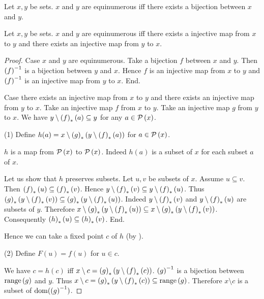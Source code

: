 \documentclass{article}
\begin{document}
  \begin{forthel}
    \begin{definition*}
      Let $x, y$ be sets.
      $x$ and $y$ are equinumerous iff there exists a bijection between $x$ and
      $y$.
    \end{definition*}

    \begin{theorem*}\label{CSB}
      Let $x,y$ be sets.
      $x$ and $y$ are equinumerous iff there exists a injective map from $x$ to
      $y$ and there exists an injective map from $y$ to $x$.
    \end{theorem*}
    \begin{proof}
      Case $x$ and $y$ are equinumerous.
        Take a bijection $f$ between $x$ and $y$.
        Then $\left(f\right)^{-1}$ is a bijection between $y$ and $x$.
        Hence $f$ is an injective map from $x$ to $y$ and $\left(f\right)^{-1}$ is an
        injective map from $y$ to $x$.
      End.

      Case there exists an injective map from $x$ to $y$ and there exists an
      injective map from $y$ to $x$.
        Take an injective map $f$ from $x$ to $y$.
        Take an injective map $g$ from $y$ to $x$.
        We have $y \setminus \left(f\right)_{*}(a) \subseteq y$ for any $a \in \mathcal{P}\left(x\right)$.

        (1) Define $h(a) = x \setminus \left(g\right)_{*}(y \setminus \left(f\right)_{*}(a))$ for $a \in \mathcal{P}\left(x\right)$.

        $h$ is a map from $\mathcal{P}\left(x\right)$ to $\mathcal{P}\left(x\right)$.
        Indeed $h(a)$ is a subset of $x$ for each subset $a$ of $x$.

        Let us show that $h$ preserves subsets.
          Let $u, v$ be subsets of $x$.
          Assume $u \subseteq v$.
          Then $\left(f\right)_{*}(u) \subseteq \left(f\right)_{*}(v)$.
          Hence $y \setminus \left(f\right)_{*}(v) \subseteq y \setminus \left(f\right)_{*}(u)$.
          Thus $\left(g\right)_{*}(y \setminus \left(f\right)_{*}(v)) \subseteq \left(g\right)_{*}(y \setminus \left(f\right)_{*}(u))$.
          Indeed $y \setminus \left(f\right)_{*}(v)$ and $y \setminus \left(f\right)_{*}(u)$ are subsets of $y$.
          Therefore $x \setminus \left(g\right)_{*}(y \setminus \left(f\right)_{*}(u)) \subseteq
          x \setminus \left(g\right)_{*}(y \setminus \left(f\right)_{*}(v))$.
          Consequently $\left(h\right)_{*}(u) \subseteq \left(h\right)_{*}(v)$.
        End.

        Hence we can take a fixed point $c$ of $h$ (by ).

        (2) Define $F(u) = f(u)$ for $u \in c$.

        We have $c = h(c)$ iff $x \setminus c = \left(g\right)_{*}(y \setminus \left(f\right)_{*}(c))$.
        $\left(g\right)^{-1}$ is a bijection between $\mathrm{range}\left(g\right)$ and $y$.
        Thus $x \setminus c = \left(g\right)_{*}(y \setminus \left(f\right)_{*}(c)) \subseteq \mathrm{range}\left(g\right)$.
        Therefore $x \setminus c$ is a subset of $\operatorname{dom}(\left(g\right)^{-1})$.


\end{proof}
\end{forthel}
\end{document}
